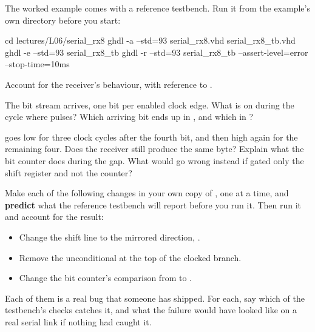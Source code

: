 
The worked example comes with a reference testbench. Run it from the example's own directory before
you start:

\begin{shell}
cd lectures/L06/serial_rx8
ghdl -a --std=93 serial_rx8.vhd serial_rx8_tb.vhd
ghdl -e --std=93 serial_rx8_tb
ghdl -r --std=93 serial_rx8_tb --assert-level=error --stop-time=10ms
\end{shell}

\label{c6:ex:rx8}
Account for the receiver's behaviour, with reference to .

 The bit stream  arrives, one bit per enabled clock edge. What
is on  during the cycle where  pulses? Which arriving bit ends up in
, and which in ?

  goes low for three clock cycles after the fourth bit, and then high
again for the remaining four. Does the receiver still produce the same byte? Explain what the bit
counter does during the gap. What would go wrong instead if  gated only the shift
register and not the counter?

 Make each of the following changes in your own copy of , one at a
time, and \textbf{predict} what the reference testbench will report before you run it. Then run it
and account for the result:
\begin{itemize}
  \item Change the shift line to the mirrored direction,
    .
  \item Remove the unconditional  at the top of the clocked branch.
  \item Change the bit counter's comparison from  to .
\end{itemize}

Each of them is a real bug that someone has shipped. For each, say which of the testbench's checks
catches it, and what the failure would have looked like on a real serial link if nothing had caught
it.
